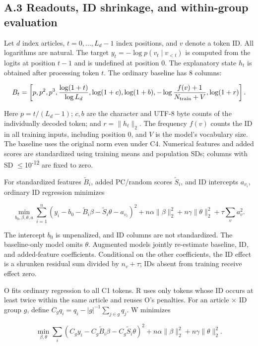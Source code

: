 \FloatBarrier

\subsection{A.3 Readouts, ID shrinkage, and within-group evaluation}\label{a.3-readouts-id-shrinkage-and-within-group-evaluation}

Let \(d\) index articles, \(t=0,\ldots,L_d-1\) index positions, and \(v\) denote a token ID. All logarithms are natural. The target \(y_t=-\log p(v_t\mid v_{<t})\) is computed from the logits at position \(t-1\) and is undefined at position 0. The explanatory state \(h_t\) is obtained after processing token \(t\). The ordinary baseline has 8 columns:

\[
B_t=\left[p,p^2,p^3,\frac{\log(1+t)}{\log L_d},
\log(1+c),\log(1+b),-\log\frac{f(v)+1}{N_{\rm train}+V},\log(1+r)\right].
\]

Here \(p=t/(L_d-1)\); \(c,b\) are the character and UTF-8 byte counts of the individually decoded token; and \(r=\|h_t\|_2\). The frequency \(f(v)\) counts the ID in all training inputs, including position 0, and \(V\) is the model's vocabulary size. The baseline uses the original norm even under C4. Numerical features and added scores are standardized using training means and population SDs; columns with SD {\(\leq\)10\textsuperscript{-}\textsuperscript{1}\textsuperscript{2}} are fixed to zero.

For standardized features \(\widetilde B_i\), added PC/random scores \(\widetilde S_i\), and ID intercepts \(a_{v_i}\), ordinary ID regression minimizes

\[
\min_{b_0,\beta,\theta,a}\sum_{i=1}^{n}(y_i-b_0-\widetilde B_i\beta-\widetilde S_i\theta-a_{v_i})^2
+n\alpha\|\beta\|_2^2+n\gamma\|\theta\|_2^2+\tau\sum_v a_v^2 .
\]

The intercept \(b_0\) is unpenalized, and ID columns are not standardized. The baseline-only model omits \(\theta\). Augmented models jointly re-estimate baseline, ID, and added-feature coefficients. Conditional on the other coefficients, the ID effect is a shrunken residual sum divided by \(n_v+\tau\); IDs absent from training receive effect zero.

O fits ordinary regression to all C1 tokens. R uses only tokens whose ID occurs at least twice within the same article and reuses O's penalties. For an article × ID group \(g\), define \(C_gq_i=q_i-|g|^{-1}\sum_{j\in g}q_j\). W minimizes

\[
\min_{\beta,\theta}\sum_i(C_gy_i-C_g\widetilde B_i\beta-C_g\widetilde S_i\theta)^2
+n\alpha\|\beta\|_2^2+n\gamma\|\theta\|_2^2 .
\]

